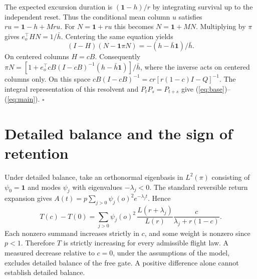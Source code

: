 \documentclass[11pt]{article}
\newcommand{\one}{\mathbf 1}
\begin{document}
The expected excursion duration is $(\one-h)/r$ by integrating survival up to the independent reset. Thus the conditional mean column $u$ satisfies $ru=\one-h+Mru$. For $N=\one+ru$ this becomes $N=\one+MN$. Multiplying by $\pi$ gives $e_o^\top HN=1/\bar h$. Centering the same equation yields
\[
 (I-H)(N-\one\pi N)=-(h-\bar h\one)/\bar h .
\]
On centered columns $H=cB$. Consequently $\pi N=[1+e_o^\top cB(I-cB)^{-1}(h-\bar h\one)]/\bar h$, where the inverse acts on centered columns only. On this space $cB(I-cB)^{-1}=cr[r(1-c)I-Q]^{-1}$. The integral representation of this resolvent and $P_tP_s=P_{t+s}$ give (\ref{eq:base})--(\ref{eq:main}). \hfill$\square$

\section{Detailed balance and the sign of retention}
Under detailed balance, take an orthonormal eigenbasis in $L^2(\pi)$ consisting of $\psi_0=\one$ and modes $\psi_j$ with eigenvalues $-\lambda_j<0$. The standard reversible return expansion \cite{chen} gives $A(t)=p\sum_{j>0}\psi_j(o)^2 e^{-\lambda_jt}$. Hence
\begin{equation}
 T(c)-T(0)=
 \sum_{j>0}\psi_j(o)^2\,\frac{L(r+\lambda_j)}{L(r)}
       \frac{c}{\lambda_j+r(1-c)} . \label{eq:reversible}
\end{equation}
Each nonzero summand increases strictly in $c$, and some weight is nonzero since $p<1$. Therefore $T$ is strictly increasing for every admissible flight law. A measured decrease relative to $c=0$, under the assumptions of the model, excludes detailed balance of the free gate. A positive difference alone cannot establish detailed balance.
\end{document}
